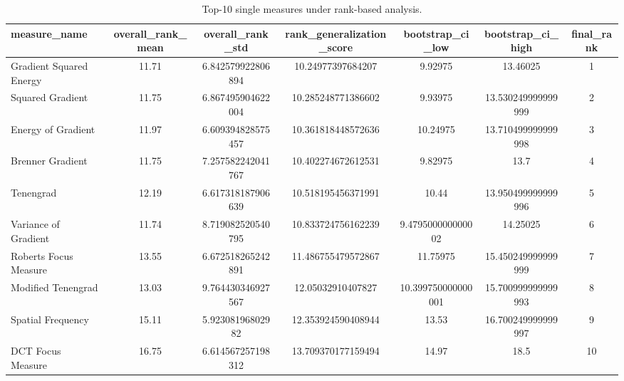 \begin{table}[t]
\centering
\caption{Top-10 single measures under rank-based analysis.}
\begin{tabular}{lcccccc}
\hline
measure_name & overall_rank_mean & overall_rank_std & rank_generalization_score & bootstrap_ci_low & bootstrap_ci_high & final_rank \\
\hline
Gradient Squared Energy & 11.71 & 6.842579922806894 & 10.24977397684207 & 9.92975 & 13.46025 & 1 \\
Squared Gradient & 11.75 & 6.867495904622004 & 10.285248771386602 & 9.93975 & 13.530249999999999 & 2 \\
Energy of Gradient & 11.97 & 6.609394828575457 & 10.361818448572636 & 10.24975 & 13.710499999999998 & 3 \\
Brenner Gradient & 11.75 & 7.257582242041767 & 10.402274672612531 & 9.82975 & 13.7 & 4 \\
Tenengrad & 12.19 & 6.617318187906639 & 10.518195456371991 & 10.44 & 13.950499999999996 & 5 \\
Variance of Gradient & 11.74 & 8.719082520540795 & 10.833724756162239 & 9.479500000000002 & 14.25025 & 6 \\
Roberts Focus Measure & 13.55 & 6.672518265242891 & 11.486755479572867 & 11.75975 & 15.450249999999999 & 7 \\
Modified Tenengrad & 13.03 & 9.764430346927567 & 12.05032910407827 & 10.399750000000001 & 15.700999999999993 & 8 \\
Spatial Frequency & 15.11 & 5.92308196802982 & 12.353924590408944 & 13.53 & 16.700249999999997 & 9 \\
DCT Focus Measure & 16.75 & 6.614567257198312 & 13.709370177159494 & 14.97 & 18.5 & 10 \\
\hline
\end{tabular}
\end{table}
